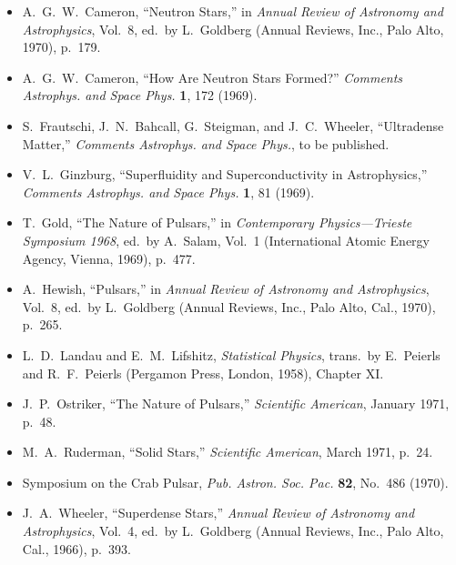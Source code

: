 \begingroup
\setlength{\emergencystretch}{1em}
\begin{itemize}
  \item[\(\square\)] A.~G.~W.~Cameron, ``Neutron Stars,'' in
  \emph{Annual Review of Astronomy and Astrophysics}, Vol.~8, ed.\ by
  L.~Goldberg (Annual Reviews, Inc., Palo Alto, 1970), p.~179.

  \item[\(\square\)] A.~G.~W.~Cameron, ``How Are Neutron Stars Formed?''
  \emph{Comments Astrophys. and Space Phys.} \textbf{1}, 172 (1969).

  \item[\(\square\)] S.~Frautschi, J.~N.~Bahcall, G.~Steigman, and
  J.~C.~Wheeler, ``Ultradense Matter,'' \emph{Comments Astrophys. and
  Space Phys.}, to be published.

  \item[\(\square\)] V.~L.~Ginzburg, ``Superfluidity and
  Superconductivity in Astrophysics,'' \emph{Comments Astrophys. and Space
  Phys.} \textbf{1}, 81 (1969).

  \item[\(\square\)] T.~Gold, ``The Nature of Pulsars,'' in
  \emph{Contemporary Physics---Trieste Symposium 1968}, ed.\ by A.~Salam,
  Vol.~1 (International Atomic Energy Agency, Vienna, 1969), p.~477.

  \item[\(\square\)] A.~Hewish, ``Pulsars,'' in \emph{Annual Review of
  Astronomy and Astrophysics}, Vol.~8, ed.\ by L.~Goldberg (Annual
  Reviews, Inc., Palo Alto, Cal., 1970), p.~265.

  \item[\(\square\)] L.~D.~Landau and E.~M.~Lifshitz,
  \emph{Statistical Physics}, trans.\ by E.~Peierls and R.~F.~Peierls
  (Pergamon Press, London, 1958), Chapter XI.

  \item[\(\square\)] J.~P.~Ostriker, ``The Nature of Pulsars,''
  \emph{Scientific American}, January 1971, p.~48.

  \item[\(\square\)] M.~A.~Ruderman, ``Solid Stars,''
  \emph{Scientific American}, March 1971, p.~24.

  \item[\(\square\)] Symposium on the Crab Pulsar,
  \emph{Pub. Astron. Soc. Pac.} \textbf{82}, No.~486 (1970).

  \item[\(\square\)] J.~A.~Wheeler, ``Superdense Stars,''
  \emph{Annual Review of Astronomy and Astrophysics}, Vol.~4, ed.\ by
  L.~Goldberg (Annual Reviews, Inc., Palo Alto, Cal., 1966), p.~393.
\end{itemize}
\endgroup

